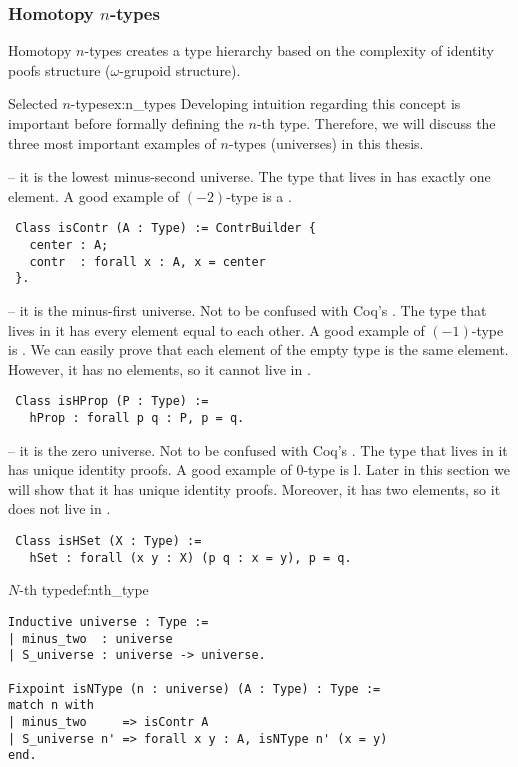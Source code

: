 \subsubsection{Homotopy $n$-types}
Homotopy $n$-types creates a type hierarchy based on the complexity of identity poofs structure ($\omega$-grupoid structure).
\begin{example}{Selected $n$-types}{ex:n_types}
Developing intuition regarding this concept is important before formally defining the $n$-th type. Therefore, we will discuss the three most important examples of $n$-types (universes) in this thesis.
\begin{description}
    \item {} -- it is the lowest minus-second universe. The type that lives in  has exactly one element. A good example of $(-2)$-type is a .
    \begin{verbatim}
 Class isContr (A : Type) := ContrBuilder {
   center : A;
   contr  : forall x : A, x = center
 }.
    \end{verbatim}
    \item {} -- it is the minus-first universe. Not to be confused with Coq's . The type that lives in it has every element equal to each other. A good example of $(-1)$-type is . We can easily prove that each element of the empty type is the same element. However, it has no elements, so it cannot live in .
        \begin{verbatim}
 Class isHProp (P : Type) :=
   hProp : forall p q : P, p = q.
    \end{verbatim}
    \item {} -- it is the zero universe. Not to be confused with Coq's . The type that lives in it has unique identity proofs. A good example of $0$-type is l. Later in this section we will show that it has unique identity proofs. Moreover, it has two elements, so it does not live in .
    \begin{verbatim}
 Class isHSet (X : Type) :=
   hSet : forall (x y : X) (p q : x = y), p = q.
    \end{verbatim}
\end{description}
\end{example}
\begin{defi}{$N$-th type}{def:nth_type}
\begin{verbatim}
Inductive universe : Type :=
| minus_two  : universe
| S_universe : universe -> universe.

Fixpoint isNType (n : universe) (A : Type) : Type :=
match n with
| minus_two     => isContr A
| S_universe n' => forall x y : A, isNType n' (x = y)
end.
\end{verbatim}
\end{defi}
